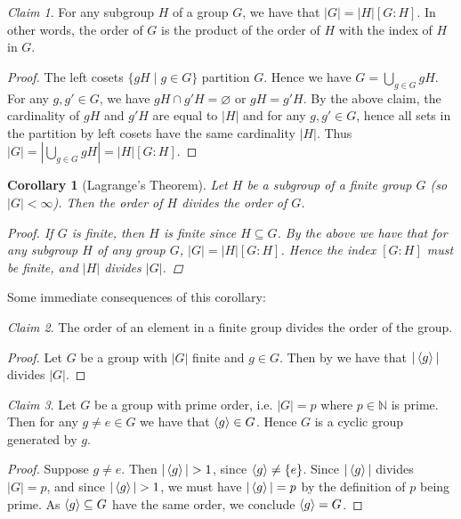 \documentclass[12pt,letterpaper,DIV=11,final]{scrartcl}
\theoremstyle{plain}
\newtheorem{corollary}{Corollary}
\theoremstyle{definition}
\theoremstyle{remark}
\newtheorem{claim}{Claim}
\begin{document}
\begin{claim}
  For any subgroup $H$ of a group $G$, we have that $|G| = |H| [G : H]$.
  In other words, the order of $G$ is the product of the order of $H$ with the index of $H$ in $G$.

  \begin{proof}
    The left cosets $\{ gH \mid g \in G \}$ partition $G$.
    Hence we have $G = \bigcup_{g \in G} gH$.
    For any $g, g' \in G$, we have $gH \cap g'H = \varnothing$ or $gH = g'H$.
    By the above claim, the cardinality of $gH$ and $g'H$ are equal to $|H|$ and for any $g, g' \in G$, hence all sets in the partition by left cosets have the same cardinality $|H|$.
    Thus $|G| = |\bigcup_{g \in G} gH| = |H| [G : H]$.
  \end{proof}
\end{claim}

\begin{corollary}[Lagrange's Theorem]\label{thm:lagrangestheorem}
  Let $H$ be a subgroup of a finite group $G$ (so $|G| < \infty$).
  Then the order of $H$ divides the order of $G$.

  \begin{proof}
    If $G$ is finite, then $H$ is finite since $H \subseteq G$.
    By the above we have that for any subgroup $H$ of any group $G$, $|G| = |H| [G : H]$.
    Hence the index $[G : H]$ must be finite, and $|H|$ divides $|G|$.
  \end{proof}
\end{corollary}

Some immediate consequences of this corollary:

\begin{claim}
  The order of an element in a finite group divides the order of the group.

  \begin{proof}
    Let $G$ be a group with $|G|$ finite and $g \in G$.
    Then by  we have that $|\braket{g}|$ divides $|G|$.
  \end{proof}
\end{claim}

\begin{claim}
  Let $G$ be a group with prime order, i.e. $|G| = p$ where $p \in \mathbb{N}$ is prime.
  Then for any $g \neq e \in G$ we have that $\braket{g} \in G$.
  Hence $G$ is a cyclic group generated by $g$.

  \begin{proof}
    Suppose $g \neq e$.
    Then $|\braket{g}| > 1$, since $\braket{g} \neq \{ e \}$.
    Since $|\braket{g}|$ divides $|G| = p$, and since $|\braket{g}| > 1$, we must have $|\braket{g}| = p$ by the definition of $p$ being prime.
    As $\braket{g} \subseteq G$ have the same order, we conclude $\braket{g} = G$.
  \end{proof}
\end{claim}
\end{document}
